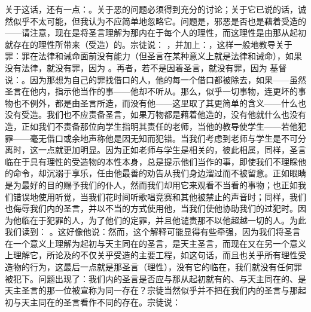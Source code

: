 关于这话，还有一点：。关于恶的问题必须得到充分的讨论；关于它已说的话，诚然似乎不太可能，但我认为不应简单地忽略它。问题是，邪恶是否也是藉着受造的——请注意，现在是将圣言理解为那内在于每个人的理性，而这理性是由那从起初就存在的理性所带来（受造）的。宗徒说： ，并加上：，这样一般地教导关于罪：罪在法律和诫命面前没有能力（但圣言在某种意义上就是法律和诫命），如果没有法律，就没有罪，因为 。再者，若不是因着圣言，就没有罪，因为 基督说：。因为那想为自己的罪找借口的人，他的每一个借口都被除去，如果——虽然圣言在他内，指示他当作的事——他却不听从。那么，似乎一切事物，连更坏的事物也不例外，都是由圣言所造，而没有他——这里取了其更简单的含义——什么也没有受造。我们也不应责备圣言，如果万物都是藉着他造的，没有他就什么也没有造，正如我们不责备那位向学生指明其责任的老师，当他的教导使学生——若他犯罪——毫无借口或余地声称他是因无知而犯错。当我们考虑到老师与学生是不可分离时，这一点就更加明显。因为正如老师与学生是相关的，彼此相属，同样，圣言临在于具有理性的受造物的本性本身，总是提示他们当作的事，即使我们不理睬他的命令，却沉溺于享乐，任由他最善的劝告从我们身边溜过而不被留意。正如眼睛是为最好的目的赐予我们的仆人，然而我们却用它来观看不当看的事物；也正如我们错误地使用听觉，当我们花时间听歌唱竞赛和其他被禁止的声音时；同样，我们也侮辱我们内的圣言，并以不当的方式使用他，当我们使他协助我们的过犯时。因为他临在于犯罪的人，为了他们的定罪，并且他谴责那不以他超越一切的人。为此我们读到： 。这好像他说：然而，这个解释可能显得有些牵强，因为我们将圣言在一个意义上理解为起初与天主同在的圣言，是天主圣言，而现在又在另一个意义上理解它，所论及的不仅关乎受造的主要工程，如这句话，而且也关乎所有理性受造物的行为，这最后一点就是那圣言（理性），没有它的临在，我们就没有任何罪被犯下。问题出现了：我们内的圣言是否应与那从起初就有的、与天主同在的、是天主圣言的那一位被宣称为同一存在？宗徒当然似乎并不把在我们内的圣言与那起初与天主同在的圣言看作不同的存在。宗徒说： \par



